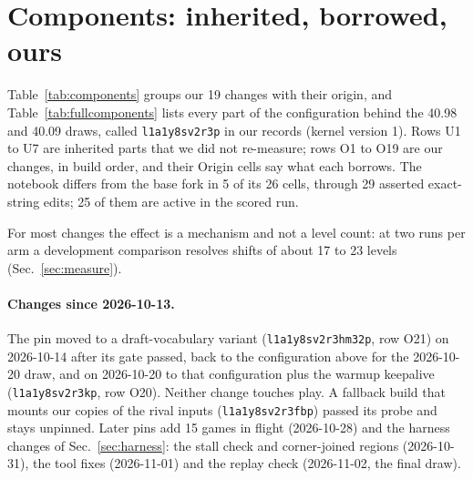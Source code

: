 \section{Components: inherited, borrowed, ours}\label{app:components}

Table~\ref{tab:components} groups our 19 changes with their origin, and Table~\ref{tab:fullcomponents} lists every part of the configuration behind the 40.98 and 40.09 draws, called \texttt{l1a1y8sv2r3p} in our records (kernel version 1). Rows U1 to U7 are inherited parts that we did not re-measure; rows O1 to O19 are our changes, in build order, and their Origin cells say what each borrows. The notebook differs from the base fork in 5 of its 26 cells, through 29 asserted exact-string edits; 25 of them are active in the scored run. %

For most changes the effect is a mechanism and not a level count: at two runs per arm a development comparison resolves shifts of about 17 to 23 levels (Sec.~\ref{sec:measure}). %

\paragraph{Changes since 2026-10-13.} The pin moved to a draft-vocabulary variant (\texttt{l1a1y8sv2r3hm32p}, row O21) on 2026-10-14 after its gate passed, back to the configuration above for the 2026-10-20 draw, and on 2026-10-20 to that configuration plus the warmup keepalive (\texttt{l1a1y8sv2r3kp}, row O20). Neither change touches play. A fallback build that mounts our copies of the rival inputs (\texttt{l1a1y8sv2r3fbp}) passed its probe and stays unpinned. Later pins add 15 games in flight (2026-10-28) and the harness changes of Sec.~\ref{sec:harness}: the stall check and corner-joined regions (2026-10-31), the tool fixes (2026-11-01) and the replay check (2026-11-02, the final draw). %

